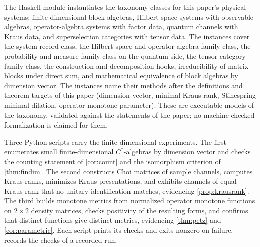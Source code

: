 \documentclass[11pt,letterpaper]{article}
\theoremstyle{definition}
\theoremstyle{remark}
\begin{document}
The Haskell module  instantiates the taxonomy classes for this paper's physical systems: finite-dimensional block algebras, Hilbert-space systems with observable algebras, operator-algebra systems with factor data, quantum channels with Kraus data, and superselection categories with tensor data. The instances cover the system-record class, the Hilbert-space and operator-algebra family class, the probability and measure family class on the quantum side, the tensor-category family class, the construction and decomposition hooks, irreducibility of matrix blocks under direct sum, and mathematical equivalence of block algebras by dimension vector. The instances name their methods after the definitions and theorem targets of this paper (dimension vector, minimal Kraus rank, Stinespring minimal dilation, operator monotone parameter). These are executable models of the taxonomy, validated against the statements of the paper; no machine-checked formalization is claimed for them.

Three Python scripts carry the finite-dimensional experiments. The first enumerates small finite-dimensional $C^*$-algebras by dimension vector and checks the counting statement of \cref{cor:count} and the isomorphism criterion of \cref{thm:findim}. The second constructs Choi matrices of sample channels, computes Kraus ranks, minimizes Kraus presentations, and exhibits channels of equal Kraus rank that no unitary identification matches, evidencing \cref{prop:krausrank}. The third builds monotone metrics from normalized operator monotone functions on $2 \times 2$ density matrices, checks positivity of the resulting forms, and confirms that distinct functions give distinct metrics, evidencing \cref{thm:petz} and \cref{cor:parametric}. Each script prints its checks and exits nonzero on failure.  records the checks of a recorded run.
\end{document}
